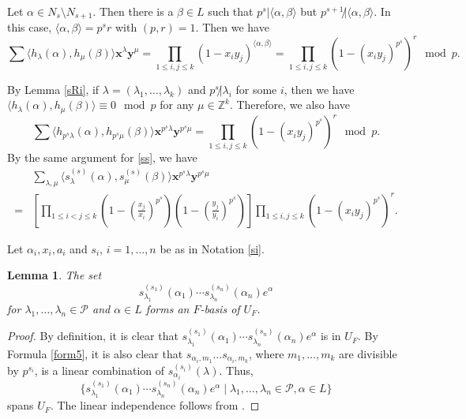 \documentclass[12pt]{article}
\def\ZZ{{\mathbb Z}}
\newcommand{\x}{\mathbf{x}}
\newcommand{\y}{\mathbf{y}}
\newtheorem{lem}[thm]{Lemma}
\begin{document}
Let $\alpha\in N_s \setminus N_{s+1}$. Then there is a $\beta\in L$ such that 
$p^{s}| \langle \alpha, \beta \rangle$ but 
$p^{s+1}\not| \langle \alpha, \beta \rangle$. In this case,  $\langle \alpha, \beta \rangle=p^sr$ with $(p,r)=1$.  Then we have
\[
\sum \langle h_\lambda(\alpha), h_\mu(\beta)\rangle \x^\lambda \y^\mu 
= \prod_{1\leq i, j\leq k} (1-x_iy_j)^ {\langle \alpha, \beta \rangle}
=  \prod_{1\leq i, j\leq k} (1-(x_iy_j)^{p^s})^{r} \mod p.  
\]

By Lemma \ref{sRi}, if $\lambda=(\lambda_1, \dots, \lambda_k)$ and ${p^s\not| \lambda_i}$ for some $i$, then we have $\langle h_\lambda(\alpha), h_\mu(\beta)\rangle\equiv 0 \mod p$ for any $\mu\in \ZZ^k$. Therefore, we also have
\[
\sum \langle h_{p^s\lambda}(\alpha), h_{p^s\mu}(\beta)\rangle \x^{p^s\lambda} \y^{p^s\mu} 
=  \prod_{1\leq i, j\leq k} (1-(x_iy_j)^{p^s})^{r} \mod p.  
\]
By the same argument for \eqref{ss},  we have 
 \begin{equation}\label{ssr}
 \begin{split}
  & \sum_{\lambda, \mu} \langle s^{(s)}_\lambda(\alpha), s^{(s)}_\mu(\beta)  \rangle \x^{p^s\lambda} \y^{p^s\mu}\\
  = &  
\left[\prod_{1\leq i<j\leq k} \left(1-(\frac{x_j}{x_i})^{p^s}\right) 
\left(1-(\frac{y_j}{y_i})^{p^s}\right) \right] \prod_{1 \leq i,j \leq k}  (1- (x_iy_j)^{p^s})^{r}. 
\end{split}
 \end{equation}

\medskip


Let $\alpha_i, x_i, a_i$ and $s_i$, $i=1, \dots,n$  be as in Notation  \ref{si}. 
 
\begin{lem}
The set 
\[
s^{(s_1)}_{\lambda_1}(\alpha_1) \cdots s^{(s_n)}_{\lambda_n}(\alpha_n) e^\alpha
\]
for $\lambda_1, \dots, \lambda_n\in \mathcal{P}$ and $\alpha\in L$ forms an $F$-basis 
of $U_F$. 
\end{lem}

\begin{proof}
By definition, it is clear that 
$s^{(s_1)}_{\lambda_1}(\alpha_1) \cdots s^{(s_n)}_{\lambda_n}(\alpha_n) e^\alpha$ is in 
$U_F$. By Formula \eqref{form5}, it is also clear that $s_{\alpha_i, m_1} \dots s_{\alpha_i,m_k}$, where  $m_1, \dots, m_k$ are divisible by $p^{s_i}$,  is a linear combination of $s^{(s_i)}_{\alpha_i}(\lambda)$. Thus,
\[
\{ s^{(s_1)}_{\lambda_1}(\alpha_1) \cdots s^{(s_n)}_{\lambda_n}(\alpha_n) e^\alpha
\mid \lambda_1, \dots, \lambda_n\in \mathcal{P}, \alpha\in L\} 
\] 
spans $U_F$. The linear independence follows from \cite[Proposition 3.6]{ivoa}. 
\end{proof}
\end{document}

